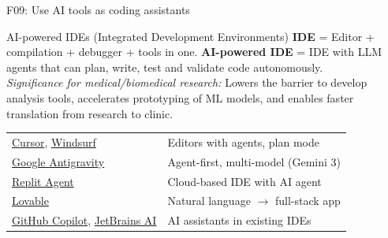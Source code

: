 \documentclass[aspectratio=169, 10pt]{beamer}
\begin{document}
\begin{frame}{F09: Use AI tools as coding assistants}
    \vspace{0.1cm}
    \begin{block}{\footnotesize AI-powered IDEs (Integrated Development Environments)}
        \scriptsize
        \textbf{IDE} = Editor + compilation + debugger + tools in one.
        \textbf{AI-powered IDE} = IDE with LLM agents that can plan, write, test and validate code autonomously.\\
        \textit{Significance for medical/biomedical research:} Lowers the barrier to develop analysis tools, accelerates prototyping of ML models, and enables faster translation from research to clinic.\\[3pt]
        \begin{tabular}{@{}ll@{}}
        \href{https://www.cursor.com/}{Cursor}, \href{https://windsurf.com/}{Windsurf} & Editors with agents, plan mode \\
        \href{https://antigravity.dev/}{Google Antigravity} & Agent-first, multi-model (Gemini 3) \\
        \href{https://replit.com/}{Replit Agent} & Cloud-based IDE with AI agent \\
        \href{https://lovable.dev/}{Lovable} & Natural language $\rightarrow$ full-stack app \\
        \href{https://github.com/features/copilot}{GitHub Copilot}, \href{https://www.jetbrains.com/ai/}{JetBrains AI} & AI assistants in existing IDEs
        \end{tabular}
    \end{block}
\end{frame}
\end{document}
